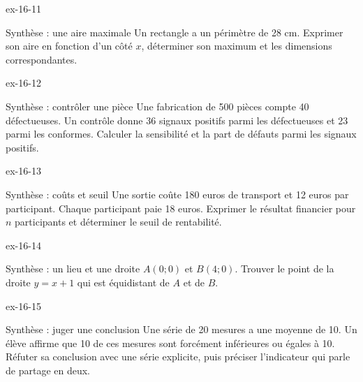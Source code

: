 \clearpage{}
\begin{blocLivre}{ex-16-11}
\begin{exercice}[3]{Synthèse : une aire maximale}
Un rectangle a un périmètre de 28 cm. Exprimer son aire en fonction d’un côté $x$, déterminer son maximum et les dimensions correspondantes.
\label{fig-ex-16-11}
\end{exercice}
\end{blocLivre}
\begin{blocLivre}{ex-16-12}
\begin{exercice}[3]{Synthèse : contrôler une pièce}
Une fabrication de 500 pièces compte 40 défectueuses. Un contrôle donne 36 signaux positifs parmi les défectueuses et 23 parmi les conformes. Calculer la sensibilité et la part de défauts parmi les signaux positifs.
\end{exercice}
\end{blocLivre}
\begin{blocLivre}{ex-16-13}
\begin{exercice}[3]{Synthèse : coûts et seuil}
Une sortie coûte 180 euros de transport et 12 euros par participant. Chaque participant paie 18 euros. Exprimer le résultat financier pour $n$ participants et déterminer le seuil de rentabilité.
\end{exercice}
\end{blocLivre}
\begin{blocLivre}{ex-16-14}
\begin{exercice}[3]{Synthèse : un lieu et une droite}
$A(0;0)$ et $B(4;0)$. Trouver le point de la droite $y=x+1$ qui est équidistant de $A$ et de $B$.
\label{fig-ex-16-14}
\end{exercice}
\end{blocLivre}
\begin{blocLivre}{ex-16-15}
\begin{exercice}[3]{Synthèse : juger une conclusion}
Une série de 20 mesures a une moyenne de 10. Un élève affirme que 10 de ces mesures sont forcément inférieures ou égales à 10. Réfuter sa conclusion avec une série explicite, puis préciser l’indicateur qui parle de partage en deux.
\end{exercice}
\end{blocLivre}

\clearpage
